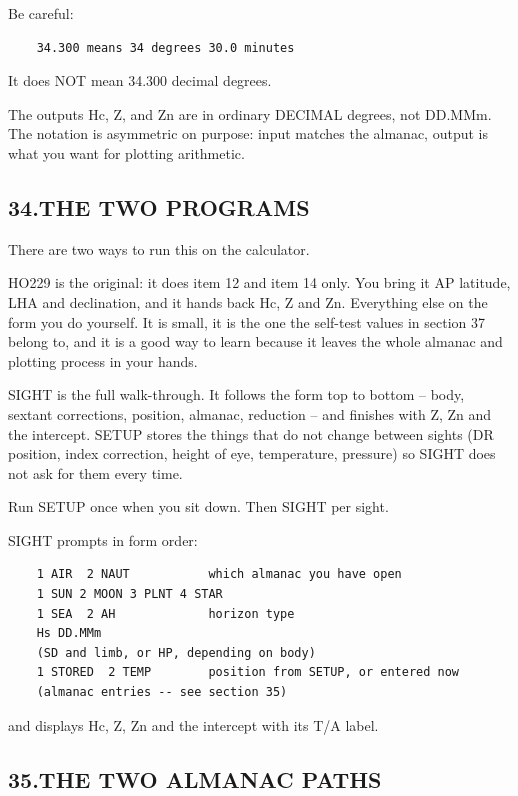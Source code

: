 \documentclass[11pt]{article}
\begin{document}
Be careful:

\begin{verbatim}
    34.300 means 34 degrees 30.0 minutes
\end{verbatim}

It does NOT mean 34.300 decimal degrees.

The outputs Hc, Z, and Zn are in ordinary DECIMAL degrees, not DD.MMm. The notation is asymmetric on purpose: input matches the almanac, output is what you want for plotting arithmetic.

\subsection*{34.\quad THE TWO PROGRAMS}

There are two ways to run this on the calculator.

HO229 is the original: it does item 12 and item 14 only. You bring it AP latitude, LHA and declination, and it hands back Hc, Z and Zn. Everything else on the form you do yourself. It is small, it is the one the self-test values in section 37 belong to, and it is a good way to learn because it leaves the whole almanac and plotting process in your hands.

SIGHT is the full walk-through. It follows the form top to bottom -- body, sextant corrections, position, almanac, reduction -- and finishes with Z, Zn and the intercept. SETUP stores the things that do not change between sights (DR position, index correction, height of eye, temperature, pressure) so SIGHT does not ask for them every time.

Run SETUP once when you sit down. Then SIGHT per sight.

SIGHT prompts in form order:

\begin{verbatim}
    1 AIR  2 NAUT           which almanac you have open
    1 SUN 2 MOON 3 PLNT 4 STAR
    1 SEA  2 AH             horizon type
    Hs DD.MMm
    (SD and limb, or HP, depending on body)
    1 STORED  2 TEMP        position from SETUP, or entered now
    (almanac entries -- see section 35)
\end{verbatim}

and displays Hc, Z, Zn and the intercept with its T/A label.

\subsection*{35.\quad THE TWO ALMANAC PATHS}
\end{document}
